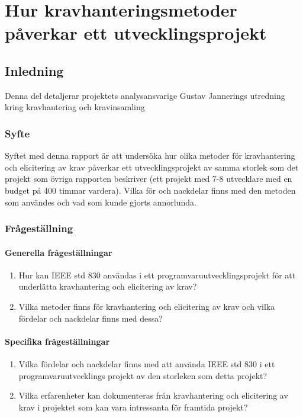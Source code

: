 \chapter{Hur kravhanteringsmetoder påverkar ett utvecklingsprojekt}
\label{cha:indiv-report-jannering}

\section{Inledning}
\label{sec:introduction-jannering}

Denna del detaljerar projektets analysansvarige Gustav Jannerings utredning kring kravhantering och kravinsamling

\subsection{Syfte}
\label{sec:purpose-jannering}

Syftet med denna rapport är att undersöka hur olika metoder för kravhantering och elicitering av krav påverkar ett utvecklingsprojekt av samma storlek som det projekt som övriga rapporten beskriver (ett projekt med 7-8 utvecklare med en budget på 400 timmar vardera). Vilka för och nackdelar finns med den metoden som användes och vad som kunde gjorts annorlunda.
\subsection{Frågeställning}
\label{sec:issue-jannering}

\subsubsection{Generella frågeställningar}
\begin{enumerate}
	\item Hur kan IEEE std 830 användas i ett programvaruutvecklingsprojekt för att underlätta kravhantering och elicitering av krav?
	
	\item Vilka metoder finns för kravhantering och elicitering av krav och vilka fördelar och nackdelar finns med dessa? 
\end{enumerate}
\subsubsection{Specifika frågeställningar}
\begin{enumerate}
	\item Vilka fördelar och nackdelar finns med att använda IEEE std 830 i ett programvaruutvecklings projekt av den storleken som detta projekt?
	
	\item Vilka erfarenheter kan dokumenteras från kravhantering och elicitering av krav i projektet som kan vara intressanta
	för framtida projekt?
	
\end{enumerate}
